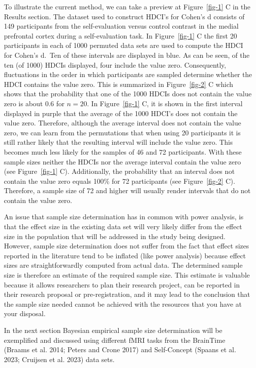 \documentclass[
  letterpaper,
  DIV=11,
  numbers=noendperiod]{scrartcl}
\begin{document}
To illustrate the current method, we can take a preview at
Figure~\ref{fig-1} C in the Results section. The dataset used to
construct HDCI's for Cohen's d consists of 149 participants from the
self-evaluation versus control contrast in the medial prefrontal cortex
during a self-evaluation task. In Figure~\ref{fig-1} C the first 20
participants in each of 1000 permuted data sets are used to compute the
HDCI for Cohen's d.~Ten of these intervals are displayed in blue. As can
be seen, of the ten (of 1000) HDCIs displayed, four include the value
zero. Consequently, fluctuations in the order in which participants are
sampled determine whether the HDCI contains the value zero. This is
summarized in Figure~\ref{fig-2} C which shows that the probability that
one of the 1000 HDCIs does not contain the value zero is about 0.6 for
\(n = 20\). In Figure~\ref{fig-1} C, it is shown in the first interval
displayed in purple that the average of the 1000 HDCI's does not contain
the value zero. Therefore, although the average interval does not
contain the value zero, we can learn from the permutations that when
using 20 participants it is still rather likely that the resulting
interval will include the value zero. This becomes much less likely for
the samples of 46 and 72 participants. With these sample sizes neither
the HDCIs nor the average interval contain the value zero (see
Figure~\ref{fig-1} C). Additionally, the probability that an interval
does not contain the value zero equals 100\% for 72 participants (see
Figure~\ref{fig-2} C). Therefore, a sample size of 72 and higher will
usually render intervals that do not contain the value zero.

An issue that sample size determination has in common with power
analysis, is that the effect size in the existing data set will very
likely differ from the effect size in the population that will be
addressed in the study being designed. However, sample size
determination does not suffer from the fact that effect sizes reported
in the literature tend to be inflated (like power analysis) because
effect sizes are straightforwardly computed from actual data. The
determined sample size is therefore an estimate of the required sample
size. This estimate is valuable because it allows researchers to plan
their research project, can be reported in their research proposal or
pre-registration, and it may lead to the conclusion that the sample size
needed cannot be achieved with the resources that you have at your
disposal.

In the next section Bayesian empirical sample size determination will be
exemplified and discussed using different fMRI tasks from the BrainTime
(Braams et al. 2014; Peters and Crone 2017) and Self-Concept (Spaans et
al. 2023; Cruijsen et al. 2023) data sets.
\end{document}
